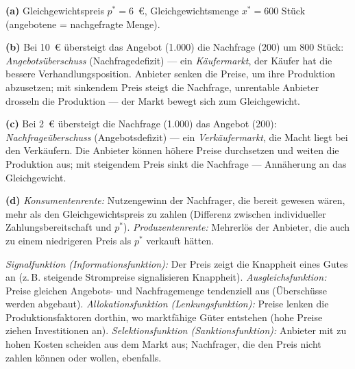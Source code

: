 \documentclass[11pt, a4paper]{article}
\begin{document}
\begin{loesung}[title={Lösung Aufgabe~7 --- Preisbildung im Gleichgewicht}]
\textbf{(a)} Gleichgewichtspreis $p^* = 6$~€, Gleichgewichtsmenge $x^* = 600$ Stück
(angebotene = nachgefragte Menge).

\textbf{(b)} Bei 10~€ übersteigt das Angebot (1.000) die Nachfrage (200) um 800 Stück:
\emph{Angebotsüberschuss} (Nachfragedefizit) --- ein \emph{Käufermarkt}, der Käufer hat die
bessere Verhandlungsposition. Anbieter senken die Preise, um ihre Produktion abzusetzen;
mit sinkendem Preis steigt die Nachfrage, unrentable Anbieter drosseln die Produktion ---
der Markt bewegt sich zum Gleichgewicht.

\textbf{(c)} Bei 2~€ übersteigt die Nachfrage (1.000) das Angebot (200):
\emph{Nachfrageüberschuss} (Angebotsdefizit) --- ein \emph{Verkäufermarkt}, die Macht liegt
bei den Verkäufern. Die Anbieter können höhere Preise durchsetzen und weiten die Produktion
aus; mit steigendem Preis sinkt die Nachfrage --- Annäherung an das Gleichgewicht.

\textbf{(d)} \emph{Konsumentenrente:} Nutzengewinn der Nachfrager, die bereit gewesen
wären, mehr als den Gleichgewichtspreis zu zahlen (Differenz zwischen individueller
Zahlungsbereitschaft und $p^*$). \emph{Produzentenrente:} Mehrerlös der Anbieter, die auch
zu einem niedrigeren Preis als $p^*$ verkauft hätten.
\end{loesung}

\begin{loesung}[title={Lösung Aufgabe~8 --- Funktionen des Marktpreises}]
\emph{Signalfunktion (Informationsfunktion):} Der Preis zeigt die Knappheit eines Gutes an
(z.\,B. steigende Strompreise signalisieren Knappheit).
\emph{Ausgleichsfunktion:} Preise gleichen Angebots- und Nachfragemenge tendenziell aus
(Überschüsse werden abgebaut).
\emph{Allokationsfunktion (Lenkungsfunktion):} Preise lenken die Produktionsfaktoren dorthin,
wo marktfähige Güter entstehen (hohe Preise ziehen Investitionen an).
\emph{Selektionsfunktion (Sanktionsfunktion):} Anbieter mit zu hohen Kosten scheiden aus dem
Markt aus; Nachfrager, die den Preis nicht zahlen können oder wollen, ebenfalls.
\end{loesung}
\end{document}
